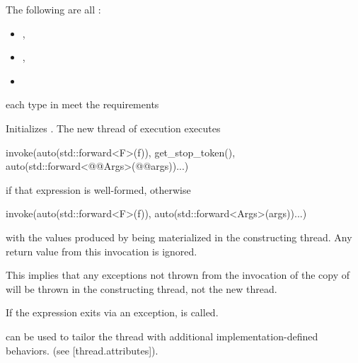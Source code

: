 \documentclass{wg21}
\begin{document}
\begin{itemdescr}
\pnum
\mandates
The following are all :
\begin{itemize}
    \item {},
    \item {}, 
    \item {}
\end{itemize}

\pnum
\expects
{} each type in  meet the
 requirements

\pnum
\effects
Initializes .
The new thread of execution executes
\begin{codeblock}
invoke(auto(std::forward<F>(f)), get_stop_token(),
       auto(std::forward<@@Args>(@@args))...)
\end{codeblock}
if that expression is well-formed,
otherwise
\begin{codeblock}
invoke(auto(std::forward<F>(f)), auto(std::forward<Args>(args))...)
\end{codeblock}
with the values produced by 
being materialized in the constructing thread.
Any return value from this invocation is ignored.
\begin{note}
This implies that any exceptions not thrown from the invocation of the copy
of  will be thrown in the constructing thread, not the new thread.
\end{note}
If the  expression exits via an exception,
 is called.

\begin{addedblock}
 can be used to tailor the thread with additional implementation-defined behaviors. (see [thread.attributes]).
\end{addedblock}


\end{itemdescr}
\end{document}
